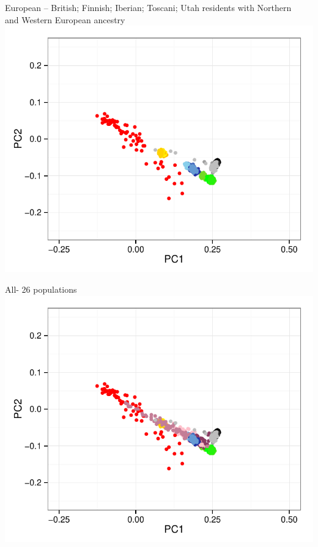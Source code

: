 \documentclass[11pt,xcolor=table]{beamer}
\begin{document}
\begin{frame}{\scriptsize{European -- British; Finnish; Iberian; Toscani; Utah residents with Northern\\ and Western European ancestry }}
\centering
\includegraphics[width=1\textwidth]{pics/pel-EUR.pdf}
\end{frame}

\begin{frame}{All- 26 populations}
\centering
\includegraphics[width=1\textwidth]{pics/pel-ALL.pdf}
\end{frame}
\end{document}
